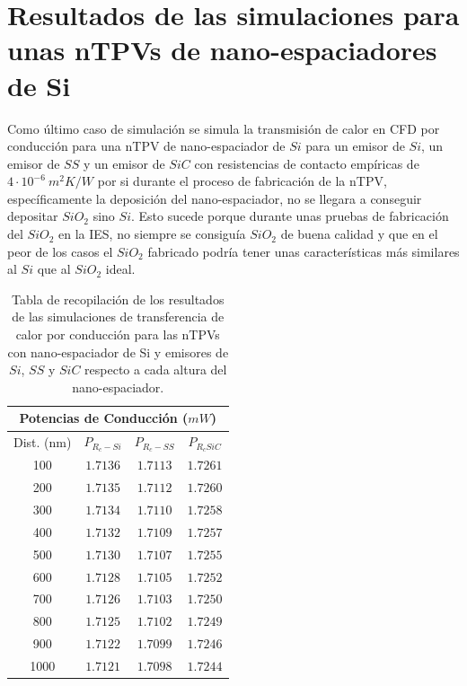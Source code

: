 \section{Resultados de las simulaciones para unas nTPVs de nano-espaciadores de Si}\label{sec:res_XxSiGe}
\graphicspath{ {./figuras/Resultados/DiffMatEsp} }
Como último caso de simulación se simula la transmisión de calor en CFD por conducción para una nTPV de nano-espaciador de $Si$ para un emisor de $Si$, un emisor de $SS$ y un emisor de $SiC$ con resistencias de contacto empíricas de $4\cdot 10^{-6} \ m^2 K/W$ por si durante el proceso de fabricación de la nTPV, específicamente la deposición del nano-espaciador, no se llegara a conseguir depositar $SiO_2$ sino $Si$. Esto sucede porque durante unas pruebas de fabricación del $SiO_2$ en la IES, no siempre se consiguía $SiO_2$ de buena calidad y que en el peor de los casos el $SiO_2$ fabricado podría tener unas características más similares al $Si$ que al $SiO_2$ ideal.
\begin{table}[H]
	\centering
	\caption{Tabla de recopilación de los resultados de las simulaciones de transferencia de calor por conducción para las nTPVs con nano-espaciador de Si y emisores de $Si$, $SS$ y $SiC$ respecto a cada altura del nano-espaciador.}
		\begin{tabular}{|c||c|c|c|}
		\hline
		 \multicolumn{4}{|c|}{\textbf{Potencias de Conducción ($mW$)}}\\	\hline
		Dist. (nm)&$P_{R_c-Si}$&$P_{R_c-SS}$&$P_{R_cSiC}$\\ \hline \hline 
		100&$1.7136$&$1.7113$&$1.7261$\\ \hline 
		200&$1.7135$&$1.7112$&$1.7260$\\ \hline 
		300&$1.7134$&$1.7110$&$1.7258$\\ \hline 
		400&$1.7132$&$1.7109$&$1.7257$\\ \hline 
		500&$1.7130$&$1.7107$&$1.7255$\\ \hline 
		600&$1.7128$&$1.7105$&$1.7252$\\ \hline 
		700&$1.7126$&$1.7103$&$1.7250$\\ \hline 
		800&$1.7125$&$1.7102$&$1.7249$\\ \hline 
		900&$1.7122$&$1.7099$&$1.7246$\\ \hline 
		1000&$1.7121$&$1.7098$&$1.7244$\\ \hline
		\end{tabular}
	\label{tab:nanoEspaciadorDeSi}
\end{table}
